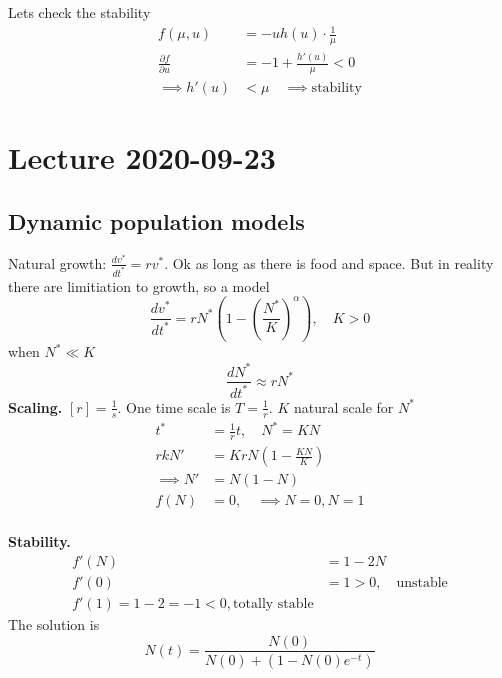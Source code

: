 \documentclass{article}
\theoremstyle{remark}
\begin{document}
Lets check the stability \[
  \begin{split}
f\left( \mu ,u \right) &=  -u h\left( u \right) \cdot \frac{1}{\mu } \\
\frac{\partial f}{\partial u}  &=  -1 + \frac{h' \left( u \right)}{\mu }  < 0 \\
\implies  h' \left( u \right)  & < \mu \quad  \implies \text{stability}
  \end{split} 
\] 


\newpage

\newpage
\section{Lecture 2020-09-23}%
\label{sec:lecture_2020_09_23}

\subsection{Dynamic population models}%
\label{sub:dynamic_population_models}

   Natural growth: $ \displaystyle  \frac{d v^{*}}{d t^{*}}  = r v^{*}$. Ok as long as there is food and space. But in reality there are limitiation to growth, so a model \[
  \frac{d v^{*}}{d t^{*}}  = r N^{*} \left( 1- \left( \frac{N^{*}}{K} \right)^{\alpha }  \right), \quad K>0 
  \] 
  when $ N^{*} \ll  K$ \[
  \frac{d N^{*}}{d t^{*}}  \approx r N^{*}
  \] 
  \textbf{Scaling.}  $\left[ r \right]=\frac{1}{s}$. One time scale is $T=\frac{1}{r}$.  $K$ natural scale for $N ^{*}$ \[
    \begin{split}
  t^{*}  & = \frac{1}{r} t , \quad  N^{*} = KN  \\
  rkN'&= KrN\left( 1 - \frac{KN}{K}  \right) \\
  \implies  N'  &=  N\left( 1-N \right) \\
  f\left( N \right) &=  0, \quad \implies  N = 0, N=1  \\
    \end{split} 
  \] 

  \textbf{Stability.}  \[
  \begin{split}
    f' \left( N \right) &=  1- 2N \\
    f' \left( 0 \right) &=  1 > 0 , \quad \text{unstable}    \\
    f' \left( 1 \right) = 1 - 2 = -1 < 0 , \text{totally stable}
  \end{split} 
  \] 
  The solution is \[
  N\left( t \right) = \frac{N\left( 0 \right)}{ N\left( 0 \right) + \left( 1 - N\left( 0 \right) e^{-t} \right)} 
  \] 
\end{document}
